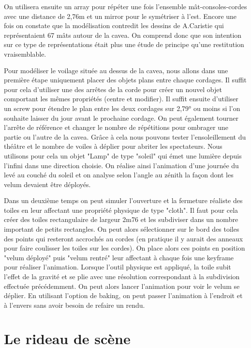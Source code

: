 On utilisera ensuite un \gls{array} pour répéter une fois l'ensemble mât-consoles-cordes avec une distance de 2,76m et un \gls{mirror} pour le symétriser à l'est. Encore une fois on constate que la modélisation contredit les dessins de A.Caristie qui représentaient 67 mâts autour de la cavea. On comprend donc que son intention sur ce type de représentations était plus une étude de principe qu'une restitution vraisemblable.

Pour modéliser le voilage située au dessus de la cavea, nous allons dans une première étape uniquement placer des objets plans entre chaque cordages. Il suffit pour cela d'utiliser une des arrêtes de la corde pour créer un nouvel objet comportant les mêmes propriétés (centre et modifier). Il suffit ensuite d'utiliser un \gls{screw} pour étendre le plan entre les deux cordages sur 2,79° ou moins si l'on souhaite laisser du jour avant le prochaine cordage. On peut également tourner l'arrête de référence et changer le nombre de répétitions pour ombrager une partie ou l'autre de la cavea. Grâce à cela nous pouvons tester l'ensoleillement du théâtre et le nombre de voiles à déplier pour abriter les spectateurs. Nous utilisons pour cela un objet "Lamp" de type "soleil" qui émet une lumière depuis l'infini dans une direction choisie. On réalise ainsi l'animation d'une journée du levé au couché du soleil et on analyse selon l'angle au zénith la façon dont les velum devaient être déployés.


Dans un deuxième temps on peut simuler l'ouverture et la fermeture réaliste des toiles en leur affectant une propriété physique de type "cloth". Il faut pour cela créer des toiles rectangulaire de largeur 2m76 et les subdiviser dans un nombre important de petits rectangles. On peut alors sélectionner sur le bord des toiles des points qui resteront accrochés au cordes (en pratique il y aurait des anneaux pour faire coulisser les toiles sur les cordes). On place alors ces points en position "velum déployé" puis "velum rentré" leur affectant à chaque fois une \gls{keyframe} pour réaliser l'animation. Lorsque l'outil physique est appliqué, la toile subit l'effet de la gravité et se plie avec une résolution correspondant à la subdivision effectuée précédemment. On peut alors lancer l'animation pour voir le velum se déplier. En utilisant l'option de \gls{baking}, on peut passer l'animation à l'endroit et à l'envers sans avoir besoin de refaire un rendu.

\section{Le rideau de scène}


